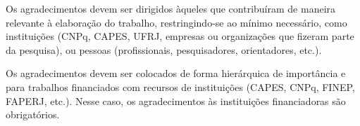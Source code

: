 
\begin{agradecimentos}
  Os agradecimentos devem ser dirigidos àqueles que contribuíram de maneira relevante à elaboração do trabalho, restringindo-se ao mínimo necessário, como instituições (CNPq, CAPES, UFRJ, empresas ou organizações que fizeram parte da pesquisa), ou pessoas (profissionais, pesquisadores, orientadores, etc.).

  Os agradecimentos devem ser colocados de forma hierárquica de importância e para trabalhos financiados com recursos de instituições (CAPES, CNPq, FINEP, FAPERJ, etc.). Nesse caso, os agradecimentos às instituições financiadoras são obrigatórios.
\end{agradecimentos}
